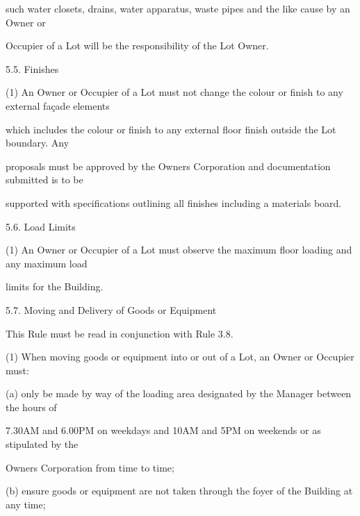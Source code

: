 \documentclass{article}
\begin{document}
{\fontsize{10.02}{1}such water closets, drains, water apparatus, waste pipes and the like cause by an Owner or }

{\fontsize{10.02}{1}Occupier of a Lot will be the responsibility of the Lot Owner. }

{\fontsize{9.99}{1}5.5. Finishes }

{\fontsize{9.962}{1}(1) An Owner or Occupier of a Lot must not change the colour or finish to any external façade elements }

{\fontsize{10.02}{1}which includes the colour or finish to any external floor finish outside the Lot boundary. Any }

{\fontsize{10.02}{1}proposals must be approved by the Owners Corporation and documentation submitted is to be }

{\fontsize{10.02}{1}supported with specifications outlining all finishes including a materials board. }

{\fontsize{9.99}{1}5.6. Load Limits }

{\fontsize{9.962}{1}(1) An Owner or Occupier of a Lot must observe the maximum floor loading and any maximum load }

{\fontsize{10.02}{1}limits for the Building. }

\newpage


















{\fontsize{9.99}{1}5.7. Moving and Delivery of Goods or Equipment }

{\fontsize{10.02}{1}This Rule must be read in conjunction with Rule 3.8. }

{\fontsize{9.962}{1}(1) When moving goods or equipment into or out of a Lot, an Owner or Occupier must: }

{\fontsize{9.962}{1}(a) only be made by way of the loading area designated by the Manager between the hours of }

{\fontsize{10.02}{1}7.30AM and 6.00PM on weekdays and 10AM and 5PM on weekends or as stipulated by the }

{\fontsize{10.02}{1}Owners Corporation from time to time; }

{\fontsize{9.962}{1}(b) ensure goods or equipment are not taken through the foyer of the Building at any time; }
\end{document}
